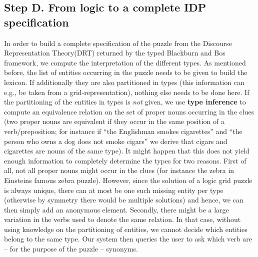 \subsection{Step D. From logic to a complete IDP specification} 
In order to build a complete specification of the puzzle from the Discourse Representation Theory(DRT) returned by the typed Blackburn and Bos framework, we compute the interpretation of the different types. 
As mentioned before, the list of entities occurring in the puzzle needs to be given to build the lexicon. If additionally they are also partitioned in types (this information can e.g., be taken from a grid-representation), nothing else needs to be done here. 
If the partitioning of the entities in types is \emph{not} given,
we  use \textbf{type inference} to compute an equivalence relation on the set of proper nouns occurring in the clues (two proper nouns are equivalent if they occur in the same position of a verb/preposition; for instance if ``the Englishman smokes cigarettes'' and ``the person who owns a dog does not smoke cigars'' we derive that cigars and cigarettes are nouns of the same type). It might happen that this does not yield enough information to completely determine the types for two reasons. 
First of all, not all proper nouns might occur in the clues (for instance the zebra in Einsteins famous zebra puzzle). 
However, since the solution of a logic grid puzzle is always unique, there can at most be one such missing entity per type (otherwise by symmetry there would be multiple solutions) and hence, we can then simply add an anonymous element. 
Secondly, there might be a large variation in the verbs used to denote the same relation. In that case, without using knowledge on the partitioning of entities, we cannot decide which entities belong to the same type. Our system then queries the user to ask which verb are -- for the purpose of the puzzle -- synonyms. 

